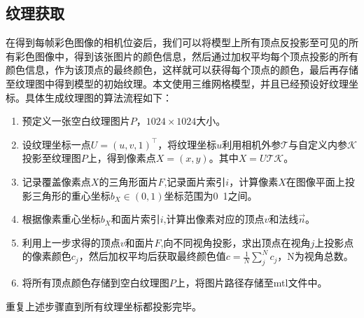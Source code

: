 \subsection{纹理获取}
在得到每帧彩色图像的相机位姿后，我们可以将模型上所有顶点反投影至可见的所有彩色图像中，得到该张图片的颜色信息，然后通过加权平均每个顶点投影的所有颜色信息，作为该顶点的最终颜色，这样就可以获得每个顶点的颜色，最后再存储至纹理图中得到模型的初始纹理。本文使用三维网格模型，并且已经预设好纹理坐标。具体生成纹理图的算法流程如下：\par




\begin{enumerate}[label=(\arabic*)]
    \item 预定义一张空白纹理图片$P$，$1024 \times 1024$大小。
    \item 设纹理坐标一点$U = (u,v,1)^\top$，将纹理坐标$u$利用相机外参$\mathcal{T}$与自定义内参$\mathcal{K}$投影至纹理图$P$上，得到像素点$X=(x,y)$。其中$X = U\mathcal{T}\mathcal{K}$。
    \item 记录覆盖像素点$X$的三角形面片$F$,记录面片索引$i$，计算像素$X$在图像平面上投影三角形的重心坐标$b_X\in(0,1)$坐标范围为0~1之间。
    \item 根据像素重心坐标$b_X$和面片索引$i$,计算出像素对应的顶点$v$和法线$\vec{n}$。
    \item 利用上一步求得的顶点$v$和面片$F$,向不同视角投影，求出顶点在视角$j$上投影点的像素颜色$c_j$，然后加权平均后获取最终颜色值$c= \frac{1}{N}  \sum_j^N c_j $，N为视角总数。
    \item 将所有顶点颜色存储到空白纹理图$P$上，将图片路径存储至mtl文件中。
\end{enumerate}


重复上述步骤直到所有纹理坐标都投影完毕。


